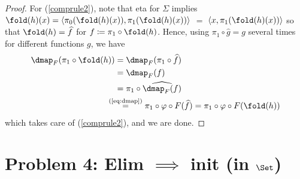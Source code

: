 \documentclass{article}
\begin{document}
\begin{proof}
For (\ref{comprule2}), note that eta for $\Sigma$ implies $\fold(h)(x) = \langle \pi_0(\fold(h)(x)), \pi_1(\fold(h)(x))\rangle$ $=$ $\langle x, \pi_1(\fold(h)(x))\rangle$ so that $\fold(h) = \widehat{f}$ for $f \coloneqq \pi_1 \circ \fold(h)$. Hence, using $\pi_1 \circ \widehat{g} = g$ several times for different functions $g$, we have
\begin{align*}
  \dmap_F(\pi_1 \circ \fold(h)) &=  \dmap_F(\pi_1 \circ \widehat{f}) \\
  &= \dmap_F(f) \\
  &= \pi_1 \circ \widehat{\dmap_F(f)} \\
  &\!\!\!\!\!\!\stackrel{\text{(\ref{eq:dmap})}}{=} \pi_1 \circ \varphi \circ F(\widehat{f}) = \pi_1 \circ \varphi \circ F(\fold(h))
\end{align*}
which takes care of (\ref{comprule2}), and we are done.
\end{proof}



\section*{Problem 4: Elim $\implies$ init (in $\Set$)}
\end{document}
